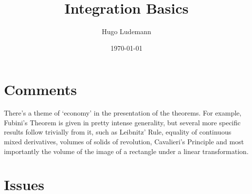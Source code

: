 \documentclass[20pt]{article}
\title{Integration Basics}
\date{\today}
\author{Hugo Ludemann}
\theoremstyle{plain}
\theoremstyle{definition}
\begin{document}
\maketitle

\section{Comments}

There's a theme of `economy' in the presentation of the theorems.
For example, Fubini's Theorem is given in pretty intense generality, 
but several more specific results follow trivially from it, 
such as Leibnitz' Rule, equality of continuous mixed derivatives,
volumes of solids of revolution, Cavalieri's Principle and most importantly 
the volume of the image of a rectangle under a linear transformation.




















































\section{Issues}
\end{document}
